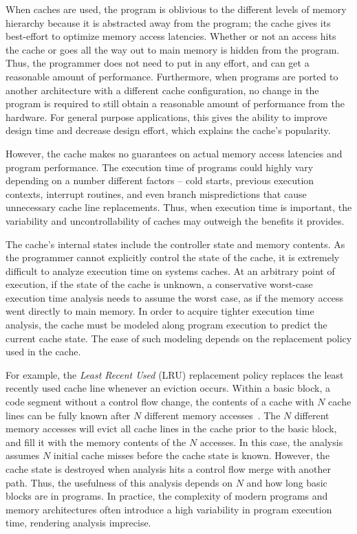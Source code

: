 When caches are used, the program is oblivious to the different levels of memory hierarchy because it is abstracted away from the program; the cache gives its best-effort to optimize memory access latencies.
Whether or not an access hits the cache or goes all the way out to main memory is hidden from the program.
Thus, the programmer does not need to put in any effort, and can get a reasonable amount of performance. 
Furthermore, when programs are ported to another architecture with a different cache configuration, no change in the program is required to still obtain a reasonable amount of performance from the hardware.   
For general purpose applications, this gives the ability to improve design time and decrease design effort, which explains the cache's popularity. 

However, the cache makes no guarantees on actual memory access latencies and program performance. 
The execution time of programs could highly vary depending on a number different factors -- cold starts, previous execution contexts, interrupt routines, and even branch mispredictions that cause unnecessary cache line replacements.  
Thus, when execution time is important, the variability and uncontrollability of caches may outweigh the benefits it provides. 

The cache's internal states include the controller state and memory contents. 
As the programmer cannot explicitly control the state of the cache, it is extremely difficult to analyze execution time on systems caches.
At an arbitrary point of execution, if the state of the cache is unknown, a conservative worst-case execution time analysis needs to assume the worst case, as if the memory access went directly to main memory.
In order to acquire tighter execution time analysis, the cache must be modeled along program execution to predict the current cache state.
The ease of such modeling depends on the replacement policy used in the cache.

For example, the \emph{Least Recent Used} (LRU) replacement policy replaces the least recently used cache line whenever an eviction occurs. 
Within a basic block, a code segment without a control flow change, the contents of a cache with $N$ cache lines can be fully known after $N$ different memory accesses~.  
The $N$ different memory accesses will evict all cache lines in the cache prior to the basic block, and fill it with the memory contents of the $N$ accesses. 
In this case, the analysis assumes $N$ initial cache misses before the cache state is known.
However, the cache state is destroyed when analysis hits a control flow merge with another path.
Thus, the usefulness of this analysis depends on $N$ and how long basic blocks are in programs.  
In practice, the complexity of modern programs and memory architectures often introduce a high variability in program execution time, rendering analysis imprecise. 


